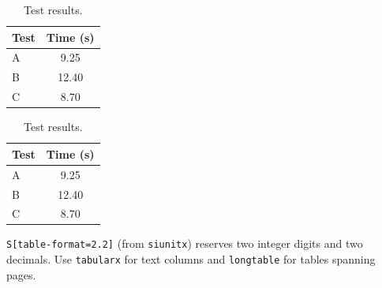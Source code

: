 \begin{referencecode}
\usepackage{booktabs,siunitx}
\end{referencecode}
\begin{referencecode}
\begin{table}[htbp]
    \centering
    \caption{Test results.}
    \label{tab:tests}
    \begin{tabular}{l S[table-format=2.2]}
        \toprule
        Test & {Time (\unit{\second})} \\
        \midrule
        A & 9.25 \\
        B & 12.40 \\
        C & 8.70 \\
        \bottomrule
    \end{tabular}
\end{table}
\end{referencecode}

\begin{table}[H]\centering
\caption{Test results.}\label{tab:tests-functional}
\begin{tabular}{l S[table-format=2.2]}
\toprule Test & {Time (\unit{\second})} \\
\midrule A & 9.25 \\ B & 12.40 \\ C & 8.70 \\\bottomrule
\end{tabular}\end{table}
\texttt{S[table-format=2.2]} (from \texttt{siunitx}) reserves two integer
digits and two decimals. Use \texttt{tabularx} for text columns and
\texttt{longtable} for tables spanning pages.


